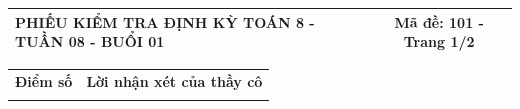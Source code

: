 \documentclass[12pt,a4paper]{article}
\begin{document}
\pagestyle{empty}
\noindent
\begin{tabularx}{\linewidth}{|X|c|}
\hline
\textbf{PHIẾU KIỂM TRA ĐỊNH KỲ TOÁN 8 - TUẦN 08 - BUỔI 01} & \textbf{Mã đề: 101 - Trang 1/2} \\
\hline
\end{tabularx}

\vspace{1.2mm}

\noindent
\begin{tabularx}{\linewidth}{|p{3.2cm}|X|}
\hline
\centering\textbf{Điểm số} & \centering\textbf{Lời nhận xét của thầy cô} \tabularnewline
\rule{0pt}{1.8cm} & \\
\hline
\end{tabularx}

\vspace{1.2mm}
\end{document}
